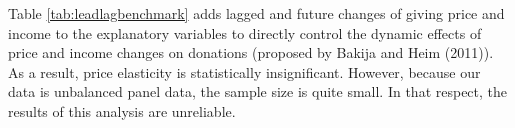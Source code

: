 \documentclass[
  11pt,
  a4paper,
]{article}
\begin{document}
Table \ref{tab:leadlagbenchmark} adds
lagged and future changes of giving price and income
to the explanatory variables
to directly control the dynamic effects of
price and income changes on donations (proposed by Bakija and Heim (2011)).
As a result, price elasticity is statistically insignificant.
However, because our data is unbalanced panel data,
the sample size is quite small.
In that respect, the results of this analysis are unreliable.
\end{document}
